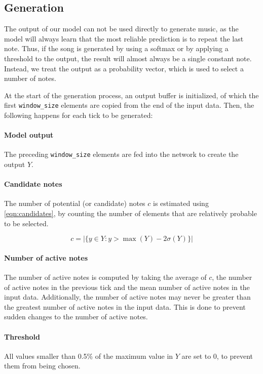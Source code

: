 \documentclass[11pt, twocolumn]{article}
\begin{document}
\subsection{Generation}
The output of our model can not be used directly to generate music, as the model will always learn that the most reliable prediction is to repeat the last note. Thus, if the song is generated by using a softmax or by applying a threshold to the output, the result will almost always be a single constant note. Instead, we treat the output as a probability vector, which is used to select a number of notes.

At the start of the generation process, an output buffer is initialized, of which the first \texttt{window\_size} elements are copied from the end of the input data. Then, the following happens for each tick to be generated:

\paragraph{Model output} The preceding \texttt{window\_size} elements are fed into the network to create the output $Y$. 

\paragraph{Candidate notes} The number of potential (or candidate) notes $c$ is estimated using \autoref{eqn:candidates}, by counting the number of elements that are relatively probable to be selected.

\begin{equation}\label{eqn:candidates}
    c = \lvert \{ y \in Y : y > \max(Y) - 2\sigma(Y) \} \rvert
\end{equation}


\paragraph{Number of active notes} The number of active notes is computed by taking the average of $c$, the number of active notes in the previous tick and the mean number of active notes in the input data. Additionally, the number of active notes may never be greater than the greatest number of active notes in the input data. This is done to prevent sudden changes to the number of active notes.

\paragraph{Threshold} All values smaller than 0.5\% of the maximum value in $Y$ are set to 0, to prevent them from being chosen.
\end{document}
